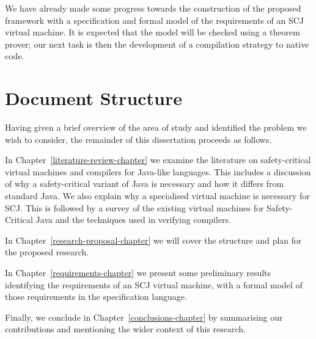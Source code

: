 \documentclass[a4paper,10pt]{report}
\begin{document}
We have already made some progress towards the construction of the
proposed framework with a specification and formal model of the
requirements of an SCJ virtual machine.
It is expected that the model will be checked using a theorem prover;
our next task is then the development of a compilation strategy to
native code.

\section{Document Structure}

Having given a brief overview of the area of study and identified the
problem we wish to consider, the remainder of this dissertation
proceeds as follows.

In Chapter~\ref{literature-review-chapter} we examine the literature
on safety-critical virtual machines and compilers for Java-like
languages.
This includes a discussion of why a safety-critical variant of Java is
necessary and how it differs from standard Java.
We also explain why a specialised virtual machine is necessary for
SCJ.
This is followed by a survey of the existing virtual machines for
Safety-Critical Java and the techniques used in verifying compilers.

In Chapter~\ref{research-proposal-chapter} we will cover the structure
and plan for the proposed research.

In Chapter~\ref{requirements-chapter} we present some preliminary
results identifying the requirements of an SCJ virtual machine, with a
formal model of those requirements in the \Circus{} specification
language.

Finally, we conclude in Chapter~\ref{conclusions-chapter} by
summarising our contributions and mentioning the wider context of this
research.

\end{document}
